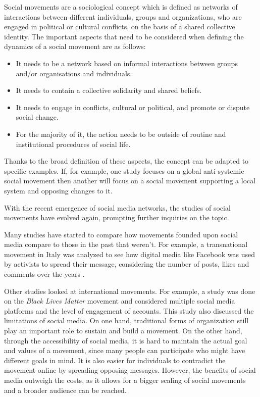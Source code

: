 \documentclass{article}
\begin{document}
    Social movements are a sociological concept which is defined as networks of interactions between different individuals, groups and organizations, who are engaged in political or cultural conflicts, on the basis of a shared collective identity. The important aspects that need to be considered when defining the dynamics of a social movement are as follows: 
    \begin{itemize}
    \item It needs to be a network based on informal interactions between groups and/or organisations and individuals.
    \item It needs to contain a collective solidarity and shared beliefs.
    \item It needs to engage in conflicts, cultural or political, and promote or dispute social change.
    \item  For the majority of it, the action needs to be outside of routine and institutional procedures of social life.
    \end{itemize}
    Thanks to the broad definition of these aspects, the concept can be adapted to specific examples. If, for example, one study focuses on a global anti-systemic social movement then another will focus on a social movement supporting a local system and opposing changes to it. \cite{diani_concept_1992}
    
    With the recent emergence of social media networks, the studies of social movements have evolved again, prompting further inquiries on the topic\cite{kumar_structure_2006}.
    
    Many studies have started to compare how movements founded upon social media compare to those in the past that weren't\cite{kidd_social_2016}. For example, a transnational movement in Italy was analyzed to see how digital media like Facebook was used by activists to spread their message, considering the number of posts, likes and comments over the  years \cite{pavan_digital_2019}. 
    
    Other studies looked at international movements. For example, a study was done on the \textit{Black Lives Matter} movement and considered multiple social media platforms and the level of engagement of accounts. This study also discussed the limitations of social media. On one hand, traditional forms of organization still play an important role to sustain and build a movement. On the other hand, through the accessibility of social media, it is hard to maintain the actual goal and values of a movement, since many people can participate who might have different goals in mind. It is also easier for individuals to contradict the movement online by spreading opposing messages. However, the benefits of social media outweigh the costs, as it allows for a bigger scaling of social movements and a broader audience can be reached. \cite{mundt_scaling_2018}
\end{document}
